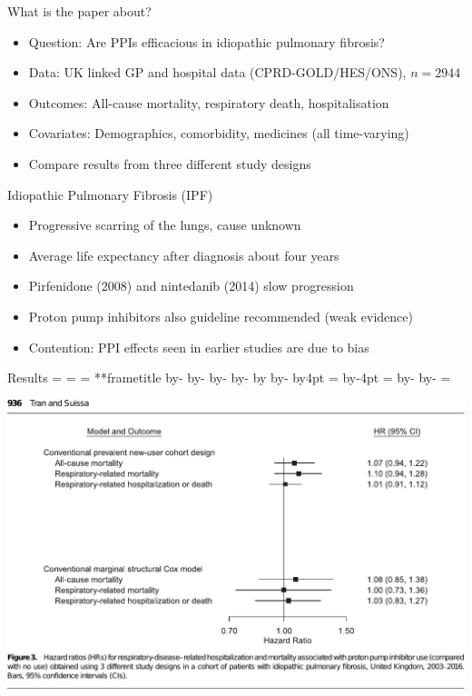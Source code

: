 \documentclass[aspectratio=169,12pt]{beamer} %
\makeatletter
\newif\ifsidebartheme
\newcommand*{\calculatespace}{%
    \contentheight=\paperheight%
    \ifx\beamer@frametitle\@empty%
        \setbox\@tempboxa=\box\voidb@x%
      \else%
        \setbox\@tempboxa=\vbox{%
          \vbox{}%
          {\parskip0pt\usebeamertemplate***{frametitle}}%
        }%
        \ifsidebartheme%
          \advance\contentheight by-1em%
        \fi%
      \fi%
    \advance\contentheight by-\ht\@tempboxa%
    \advance\contentheight by-\dp\@tempboxa%
    \advance\contentheight by-\beamer@frametopskip%
    \ifbeamer@plainframe%
    \contentbottom=0pt%
    \else%
    \advance\contentheight by-\headheight%
    \advance\contentheight by\headdp%
    \advance\contentheight by-\footheight%
    \advance\contentheight by4pt%
    \contentbottom=\footheight%
    \advance\contentbottom by-4pt%
    \fi%
    \contentwidth=\paperwidth%
    \ifbeamer@plainframe%
    \contentleft=0pt%
    \else%
    \advance\contentwidth by-\beamer@rightsidebar%
    \advance\contentwidth by-\beamer@leftsidebar\relax%
    \contentleft=\beamer@leftsidebar%
    \fi%
}
\makeatother
\begin{document}
\begin{frame}{What is the paper about?}
    \begin{itemize}
	\item Question: Are PPIs efficacious in idiopathic pulmonary fibrosis?
	\item Data: UK linked GP and hospital data (CPRD-GOLD/HES/ONS), $n=2944$
	\item Outcomes: All-cause mortality, respiratory death, hospitalisation
	\item Covariates: Demographics, comorbidity, medicines (all time-varying)
	\item Compare results from three different study designs
    \end{itemize}
\end{frame}

\begin{frame}{Idiopathic Pulmonary Fibrosis (IPF)}
    \begin{itemize}
        \item Progressive scarring of the lungs, cause unknown
	\item Average life expectancy after diagnosis about four years
	\item Pirfenidone (2008) and nintedanib (2014) slow progression
	\item Proton pump inhibitors also guideline recommended (weak evidence)
	\item Contention: PPI effects seen in earlier studies are due to bias
    \end{itemize}
\end{frame}

\begin{frame}{Results}
    \calculatespace%
    \begin{center}
	\includegraphics[height=0.90\contentheight]{ref/suissa-fig3-mscm.pdf}
    \end{center}
\end{frame}
\end{document}
